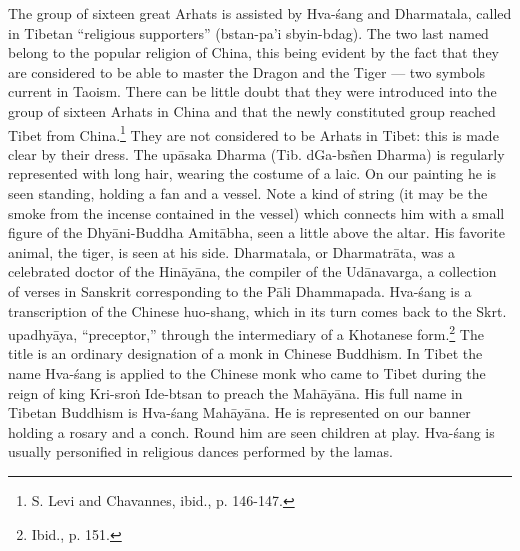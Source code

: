 \documentclass[a4paper, 12pt, oneside]{article}
\begin{document}
The group of sixteen great Arhats is assisted by Hva-\'{s}ang and Dharmatala, called in Tibetan ``religious supporters'' (bstan-pa'i sbyin-bdag). The two last named belong to the popular religion of China, this being evident by the fact that they are considered to be able to master the Dragon and the Tiger --- two symbols current in Taoism. There can be little doubt that they were introduced into the group of sixteen Arhats in China and that the newly constituted group reached Tibet from China.\footnote{S. Levi and Chavannes, ibid., p. 146-147.} They are not considered to be Arhats in Tibet: this is made clear by their dress. The up\={a}saka Dharma (Tib. dGa-bs\~{n}en Dharma) is regularly represented with long hair, wearing the costume of a laic. On our painting he is seen standing, holding a fan and a vessel. Note a kind of string (it may be the smoke from the incense contained in the vessel) which connects him with a small figure of the Dhy\={a}ni-Buddha Amit\={a}bha, seen a little above the altar. His favorite animal, the tiger, is seen at his side. Dharmatala, or Dharmatr\={a}ta, was a celebrated doctor of the Hin\={a}y\={a}na, the compiler of the Ud\={a}navarga, a collection of verses in Sanskrit corresponding to the P\={a}li Dhammapada. Hva-\'{s}ang is a transcription of the Chinese huo-shang, which in its turn comes back to the Skrt. upadhy\={a}ya, ``preceptor,'' through the intermediary of a Khotanese form.\footnote{Ibid., p. 151.} The title is an ordinary designation of a monk in Chinese Buddhism. In Tibet the name Hva-\'{s}ang is applied to the Chinese monk who came to Tibet during the reign of king Kri-sro\.{n} Ide-btsan to preach the Mah\={a}y\={a}na. His full name in Tibetan Buddhism is Hva-\'{s}ang Mah\={a}y\={a}na. He is represented on our banner holding a rosary and a conch. Round him are seen children at play. Hva-\'{s}ang is usually personified in religious dances performed by the lamas.

\bigskip
\end{document}
